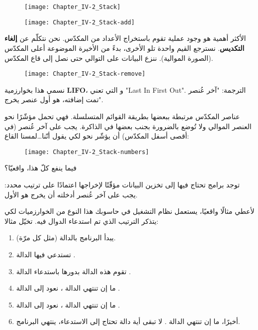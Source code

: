 \begin{figure}[H]
	\centering
	\texttt{[image: Chapter\_IV-2\_Stack]}
\end{figure}
\begin{figure}[H]
	\centering
	\texttt{[image: Chapter\_IV-2\_Stack-add]}
\end{figure}

الأكثر أهمية هو وجود عملية تقوم باستخراج الأعداد من المكدّس. نحن نتكلّم عن
\textbf{إلغاء التكديس}.
نسترجع القيم واحدة تلو الأخرى، بدءً من الأخيرة الموضوعة أعلى المكدّس (الصورة الموالية). ننزع البيانات على التوالي حتى نصل إلى قاع المكدّس.

\begin{figure}[H]
	\centering
	\texttt{[image: Chapter\_IV-2\_Stack-remove]}
\end{figure}

نسمي هذا بخوارزمية
\textbf{\textenglish{LIFO}}،
و التي تعني
"\textenglish{Last In First Out}".
الترجمة: "آخر عُنصر تمت إضافته، هو أول عنصر يخرج".

عناصر المكدّس مرتبطة ببعضها بطريقة القوائم المتسلسلة. فهي تحمل مؤشّرًا نحو العنصر الموالي ولا تُوضع بالضرورة بجنب بعضها في الذاكرة. يجب على آخر عُنصر (في أقصى أسفل المكدّس) أن يؤشّر نحو
لكي يقول أنّنا\dots لمسنا القاع:

\begin{figure}[H]
	\centering
	\texttt{[image: Chapter\_IV-2\_Stack-numbers]}
\end{figure}

\begin{question}
 فيما ينفع كلّ هذا، واقعيّا؟
\end{question}

توجد برامج تحتاج فيها إلى تخزين البيانات مؤقّتًا لإخراجها اعتمادًا على ترتيب محدد: يجب على آخر عُنصر أدخلته أن يخرج هو الأول.

لأعطي مثالًا واقعيًا، يستعمل نظام التشغيل في حاسوبك هذا النوع من الخوارزميات لكي يتذكر الترتيب الذي تم استدعاء الدوال فيه. تخيّل مثالا:

\begin{enumerate}
	\item يبدأ البرنامج بالدالة
	(مثل كل مرّة).
	\item تستدعي فيها الدالة 
	.
	\item تقوم هذه الدالة 
	بدورها باستدعاء الدالة
	.
	\item ما إن تنتهي الدالة
	،
	نعود إلى الدالة
	.
	\item ما إن تنتهي الدالة 
	،
	نعود إلى الدالة 
	.
	\item أخيرًا، ما إن تنتهي الدالة
	.
	لا تبقى أية دالة تحتاج إلى الاستدعاء، ينتهي البرنامج.
\end{enumerate}


